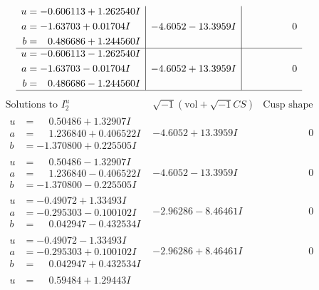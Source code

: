 \documentclass[1p]{elsarticle_modified}
\theoremstyle{definition}
\newcommand{\I}{\sqrt{-1}}
\begin{document}
$$\begin{array}{c|c|c}
\begin{aligned}
u &= -0.606113 + 1.262540 I \\
a &= -1.63703 + 0.01704 I \\
b &= \phantom{-}0.486686 + 1.244560 I\end{aligned}
 & -4.6052 - 13.3959 I & \phantom{-0.000000 } 0 \\ \hline\begin{aligned}
u &= -0.606113 - 1.262540 I \\
a &= -1.63703 - 0.01704 I \\
b &= \phantom{-}0.486686 - 1.244560 I\end{aligned}
 & -4.6052 + 13.3959 I & \phantom{-0.000000 } 0\\
 \hline 
 \end{array}$$\newpage$$\begin{array}{c|c|c}  
\text{Solutions to }I^u_{2}& \I (\text{vol} + \sqrt{-1}CS) & \text{Cusp shape}\\
 \hline 
\begin{aligned}
u &= \phantom{-}0.50486 + 1.32907 I \\
a &= \phantom{-}1.236840 + 0.406522 I \\
b &= -1.370800 + 0.225505 I\end{aligned}
 & -4.6052 + 13.3959 I & \phantom{-0.000000 } 0 \\ \hline\begin{aligned}
u &= \phantom{-}0.50486 - 1.32907 I \\
a &= \phantom{-}1.236840 - 0.406522 I \\
b &= -1.370800 - 0.225505 I\end{aligned}
 & -4.6052 - 13.3959 I & \phantom{-0.000000 } 0 \\ \hline\begin{aligned}
u &= -0.49072 + 1.33493 I \\
a &= -0.295303 - 0.100102 I \\
b &= \phantom{-}0.042947 - 0.432534 I\end{aligned}
 & -2.96286 - 8.46461 I & \phantom{-0.000000 } 0 \\ \hline\begin{aligned}
u &= -0.49072 - 1.33493 I \\
a &= -0.295303 + 0.100102 I \\
b &= \phantom{-}0.042947 + 0.432534 I\end{aligned}
 & -2.96286 + 8.46461 I & \phantom{-0.000000 } 0 \\ \hline\begin{aligned}
u &= \phantom{-}0.59484 + 1.29443 I \\

\end{aligned}
\end{array}$$
\end{document}

